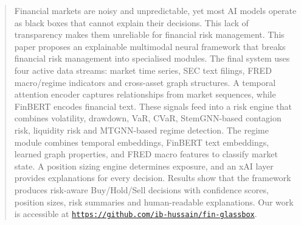\documentclass[conference]{IEEEtran}
\begin{document}
\begin{abstract}
Financial markets are noisy and unpredictable, yet most AI models operate as black boxes that cannot explain their decisions. This lack of transparency makes them unreliable for financial risk management. This paper proposes an explainable multimodal neural framework that breaks financial risk management into specialised modules. The final system uses four active data streams: market time series, SEC text filings, FRED macro/regime indicators and cross-asset graph structures. A temporal attention encoder captures relationships from market sequences, while FinBERT encodes financial text. These signals feed into a risk engine that combines volatility, drawdown, VaR, CVaR, StemGNN-based contagion risk, liquidity risk and MTGNN-based regime detection. The regime module combines temporal embeddings, FinBERT text embeddings, learned graph properties, and FRED macro features to classify market state. A position sizing engine determines exposure, and an xAI layer provides explanations for every decision. Results show that the framework produces risk-aware Buy/Hold/Sell decisions with confidence scores, position sizes, risk summaries and human-readable explanations. Our work is accessible at \textmd{\texttt{\url{https://github.com/ib-hussain/fin-glassbox}}}.
\end{abstract}
\end{document}
